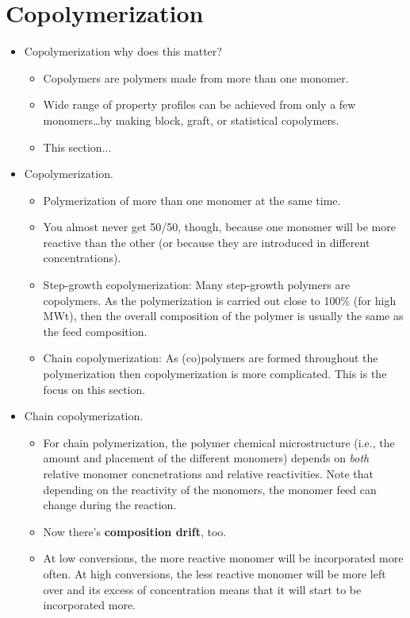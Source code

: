 \documentclass[../notes.tex]{subfiles}
\begin{document}
\section{Copolymerization}
\begin{itemize}
    \item {}Copolymerization why does this matter?
    \begin{itemize}
        \item Copolymers are polymers made from more than one monomer.
        \item Wide range of property profiles can be achieved from only a few monomers\dots by making block, graft, or statistical copolymers.
        \item This section...
    \end{itemize}
    \item Copolymerization.
    \begin{itemize}
        \item Polymerization of more than one monomer at the same time.
        \item You almost never get 50/50, though, because one monomer will be more reactive than the other (or because they are introduced in different concentrations).
        \item Step-growth copolymerization: Many step-growth polymers are copolymers. As the polymerization is carried out close to 100\% (for high MWt), then the overall composition of the polymer is usually the same as the feed composition.
        \item Chain copolymerization: As (co)polymers are formed throughout the polymerization then copolymerization is more complicated. This is the focus on this section.
    \end{itemize}
    \item Chain copolymerization.
    \begin{itemize}
        \item For chain polymerization, the polymer chemical microstructure (i.e., the amount and placement of the different monomers) depends on \emph{both} relative monomer concnetrations and relative reactivities. Note that depending on the reactivity of the monomers, the monomer feed can change during the reaction.
        \item Now there's \textbf{composition drift}, too.
        \item At low conversions, the more reactive monomer will be incorporated more often. At high conversions, the less reactive monomer will be more left over and its excess of concentration means that it will start to be incorporated more.

\end{itemize}
\end{itemize}
\end{document}
